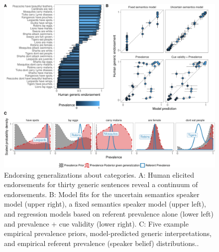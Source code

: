 \documentclass[english,,man,floatsintext]{apa6}
\theoremstyle{definition}
\theoremstyle{definition}
\theoremstyle{definition}
\theoremstyle{remark}
\begin{document}
\begin{figure}[!h]
\includegraphics[width=\textwidth]{figs/generics-endorsement-figure-1} \caption{Endorsing generalizations about categories. A: Human elicited endorsements for thirty generic sentences reveal a continuum of endorsements. B: Model fits for the uncertain semantics speaker model (upper right), a fixed semantics speaker model (upper left), and regression models based on referent prevalence alone (lower left) and prevalence + cue validity (lower right). C: Five example empirical prevalence priors, model-predicted generic interpretations, and empirical referent prevalence (speaker belief) distributions..}\label{fig:generics-endorsement-figure}
\end{figure}
\end{document}
